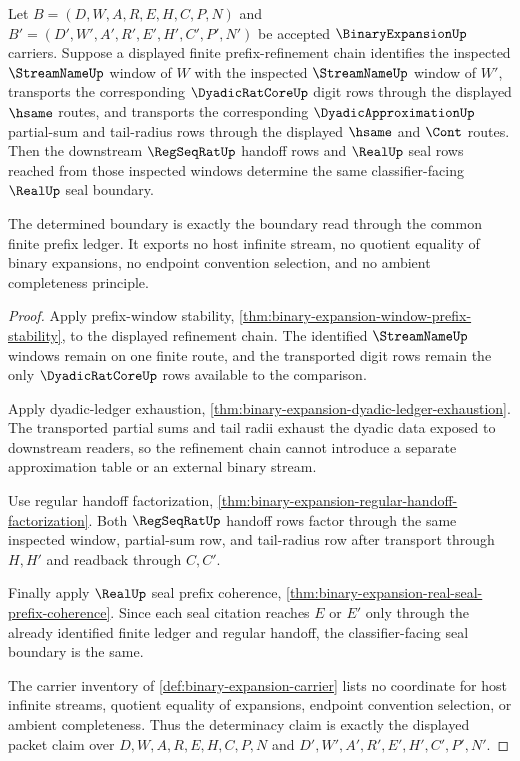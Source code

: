 \begin{theorem}
\label{thm:binary-expansion-prefix-refinement-real-seal-determinacy}
Let $B=(D,W,A,R,E,H,C,P,N)$ and $B'=(D',W',A',R',E',H',C',P',N')$ be accepted $\BinaryExpansionUp$ carriers. Suppose a displayed finite prefix-refinement chain identifies the inspected $\StreamNameUp$ window of $W$ with the inspected $\StreamNameUp$ window of $W'$, transports the corresponding $\DyadicRatCoreUp$ digit rows through the displayed $\hsame$ routes, and transports the corresponding $\DyadicApproximationUp$ partial-sum and tail-radius rows through the displayed $\hsame$ and $\Cont$ routes. Then the downstream $\RegSeqRatUp$ handoff rows and $\RealUp$ seal rows reached from those inspected windows determine the same classifier-facing $\RealUp$ seal boundary.

The determined boundary is exactly the boundary read through the common finite prefix ledger. It exports no host infinite stream, no quotient equality of binary expansions, no endpoint convention selection, and no ambient completeness principle.
\end{theorem}
\begin{proof}
Apply prefix-window stability, \autoref{thm:binary-expansion-window-prefix-stability}, to the displayed refinement chain. The identified $\StreamNameUp$ windows remain on one finite route, and the transported digit rows remain the only $\DyadicRatCoreUp$ rows available to the comparison.

Apply dyadic-ledger exhaustion, \autoref{thm:binary-expansion-dyadic-ledger-exhaustion}. The transported partial sums and tail radii exhaust the dyadic data exposed to downstream readers, so the refinement chain cannot introduce a separate approximation table or an external binary stream.

Use regular handoff factorization, \autoref{thm:binary-expansion-regular-handoff-factorization}. Both $\RegSeqRatUp$ handoff rows factor through the same inspected window, partial-sum row, and tail-radius row after transport through $H,H'$ and readback through $C,C'$.

Finally apply $\RealUp$ seal prefix coherence, \autoref{thm:binary-expansion-real-seal-prefix-coherence}. Since each seal citation reaches $E$ or $E'$ only through the already identified finite ledger and regular handoff, the classifier-facing seal boundary is the same.

The carrier inventory of \autoref{def:binary-expansion-carrier} lists no coordinate for host infinite streams, quotient equality of expansions, endpoint convention selection, or ambient completeness. Thus the determinacy claim is exactly the displayed packet claim over $D,W,A,R,E,H,C,P,N$ and $D',W',A',R',E',H',C',P',N'$.
\end{proof}

